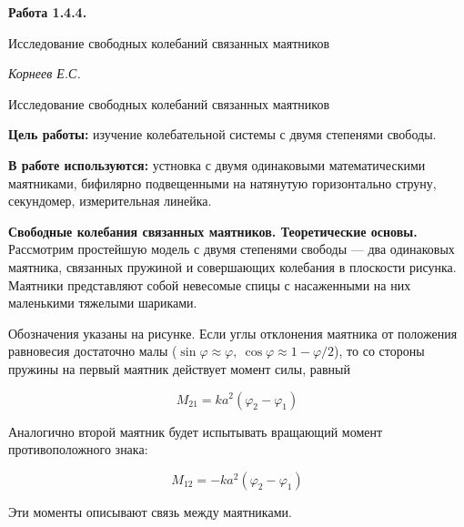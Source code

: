 \documentclass[14pt]{article}
\begin{document}
\begin{titlepage}
	\begin{center}
		\fontsize{18pt}{20pt}\selectfont
		\textbf{Работа 1.4.4.}	
	
		\vspace{5cm}
		\fontsize{24pt}{25pt}\selectfont
		Исследование свободных колебаний связанных маятников
	\end{center}
	\begin{flushright}
		\fontsize{18pt}{20pt}\selectfont
		\vspace{14cm}
		\hspace{-3cm}
		\textit{Корнеев Е.С.}
	\end{flushright}		
\end{titlepage}

\begin{center}
	\fontsize{16pt}{18pt}\selectfont	
	Исследование свободных колебаний связанных маятников
\end{center}

\fontsize{14pt}{16pt}\selectfont
\vspace{1cm}
\textbf{Цель работы:} изучение колебательной системы с двумя степенями свободы.

\vspace{0.5cm}
\textbf{В работе используются:} устновка с двумя одинаковыми математическими маятниками, бифилярно подвещенными на натянутую горизонтально струну, секундомер, измерительная линейка.

\vspace{1cm}
\textbf{Свободные колебания связанных маятников. Теоретические основы.} Рассмотрим простейшую модель с двумя степенями свободы --- два одинаковых маятника, связанных пружиной и совершающих колебания в плоскости рисунка. Маятники представляют собой невесомые спицы с насаженными на них маленькими тяжелыми шариками.

Обозначения указаны на рисунке. Если углы отклонения маятника от положения равновесия достаточно малы 
($\sin\varphi \approx \varphi,~\cos\varphi \approx 1 - \varphi/2$), то со стороны пружины на первый маятник действует момент силы, равный

$$M_{21} = ka^2(\varphi_2 - \varphi_1)$$

\noindent Аналогично второй маятник будет испытывать вращающий момент противоположного знака:

$$M_{12} = -ka^2(\varphi_2 - \varphi_1)$$

\noindent Эти моменты описывают связь между маятниками.
\end{document}
